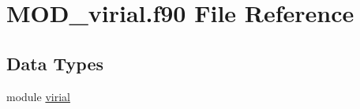 \hypertarget{MOD__virial_8f90}{\section{M\-O\-D\-\_\-virial.\-f90 File Reference}
\label{MOD__virial_8f90}
}
\subsection*{Data Types}
\begin{DoxyCompactItemize}
\item 
module \hyperlink{classvirial}{virial}
\end{DoxyCompactItemize}
